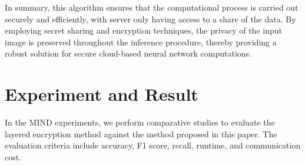\documentclass[conference]{IEEEtran}
\newcommand{\DEnc}{\texttt{DEnc}}
\newcommand{\PEnc}{\texttt{PEnc}}
\begin{document}


In summary, this algorithm ensures that the computational process is carried out securely and efficiently, with server only having access to a share of the data. By employing secret sharing and encryption techniques, the privacy of the input image is preserved throughout the inference procedure, thereby providing a robust solution for secure cloud-based neural network computations.



\section{Experiment and Result}
In the MIND experiments, we perform comparative studies to evaluate the layered encryption method against the method proposed in this paper. The evaluation criteria include accuracy, F1 score, recall, runtime, and communication cost.
\end{document}

